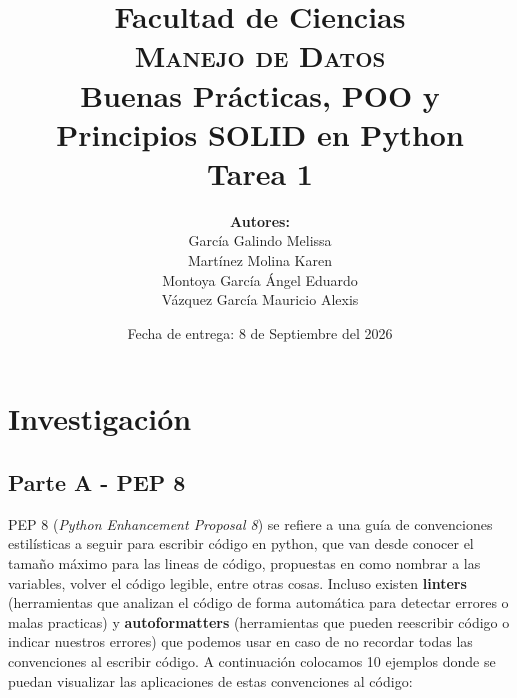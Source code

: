 \documentclass[12pt, letterpaper]{article}
\title{
    \Large \textbf{Facultad de Ciencias} \\[0.3em]
    \large \textsc{Manejo de Datos} \\[1.5em]
    \LARGE \textbf{Buenas Prácticas, POO y Principios SOLID en Python} \\[0.5em]
    \Large Tarea 1
}
\author{
    \textbf{Autores:} \\[0.5em]
    García Galindo Melissa \\
    Martínez Molina Karen \\
    Montoya García Ángel Eduardo \\
    Vázquez García Mauricio Alexis
}
\date{Fecha de entrega: 8 de Septiembre del 2026}
\begin{document}
\maketitle
\newpage

\section{Investigación}

\subsection{Parte A - PEP 8}
PEP 8 (\textit{Python Enhancement Proposal 8}) se refiere a una guía de convenciones estilísticas a seguir para escribir código en python, que van desde conocer el tamaño máximo para las lineas de código, propuestas en como nombrar a las variables, volver el código legible, entre otras cosas. Incluso existen \textbf{linters} (herramientas que analizan el código de forma automática para detectar errores o malas practicas) y \textbf{autoformatters} (herramientas que pueden reescribir código o indicar nuestros errores) que podemos usar en caso de no recordar todas las convenciones al escribir código. A continuación colocamos 10 ejemplos donde se puedan visualizar las aplicaciones de estas convenciones al código:
\end{document}
